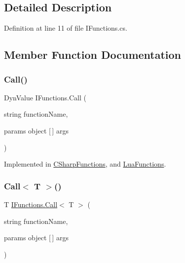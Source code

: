 \subsection{Detailed Description}


Definition at line 11 of file I\+Functions.\+cs.



\subsection{Member Function Documentation}
\mbox{\label{interface_i_functions_a0d5502d86d4b34c04f36d7f8a41c5f27}} 
\subsubsection{\texorpdfstring{Call()}{Call()}}
{\footnotesize\ttfamily Dyn\+Value I\+Functions.\+Call (\begin{DoxyParamCaption}\item[{string}]{function\+Name,  }\item[{params object \mbox{[}$\,$\mbox{]}}]{args }\end{DoxyParamCaption})}



Implemented in \hyperlink{class_c_sharp_functions_a6c500d1a443f10a60c96819583cc3168}{C\+Sharp\+Functions}, and \hyperlink{class_lua_functions_a8662db102890d5b12fada540482c51eb}{Lua\+Functions}.

\mbox{\label{interface_i_functions_ab14a9a3261c860d7dba22a9c927f1068}} 
\subsubsection{\texorpdfstring{Call$<$ T $>$()}{Call< T >()}}
{\footnotesize\ttfamily T \hyperlink{interface_i_functions_a0d5502d86d4b34c04f36d7f8a41c5f27}{I\+Functions.\+Call}$<$ T $>$ (\begin{DoxyParamCaption}\item[{string}]{function\+Name,  }\item[{params object \mbox{[}$\,$\mbox{]}}]{args }\end{DoxyParamCaption})}



